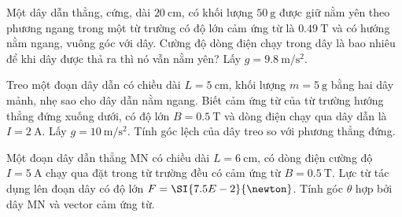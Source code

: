 \begin{ex}
	Một dây dẫn thẳng, cứng, dài $\SI{20}{\centi\meter}$, có khối lượng $\SI{50}{\gram}$ được giữ nằm yên theo phương ngang trong một từ trường có độ lớn cảm ứng từ là $\SI{0.49}{\tesla}$ và có hướng nằm ngang, vuông góc với dây. Cường độ dòng điện chạy trong dây là bao nhiêu để khi dây được thả ra thì nó vẫn nằm yên? Lấy $g=\SI{9.8}{\meter/\second^2}$.
	
\end{ex}

\begin{ex}
	Treo một đoạn dây dẫn có chiều dài $L=\SI{5}{\centi\meter}$, khối lượng $m=\SI{5}{\gram}$ bằng hai dây mảnh, nhẹ sao cho dây dẫn nằm ngang. Biết cảm ứng từ của từ trường hướng thẳng đứng xuống dưới, có độ lớn $B=\SI{0.5}{\tesla}$ và dòng điện chạy qua dây dẫn là $I=\SI{2}{\ampere}$. Lấy $g=\SI{10}{\meter/\second^2}$. Tính góc lệch của dây treo so với phương thẳng đứng.
\end{ex}
\begin{ex}
	Một đoạn dây dẫn thẳng MN có chiều dài $L=\SI{6}{\centi\meter}$, có dòng điện cường độ $I=\SI{5}{\ampere}$ chạy qua đặt trong từ trường đều có cảm ứng từ $B=\SI{0.5}{\tesla}$. Lực từ tác dụng lên đoạn dây có độ lớn $F=\SI{7.5E-2}{\newton}$. Tính góc $\theta$ hợp bởi dây MN và vector cảm ứng từ.
\end{ex}
